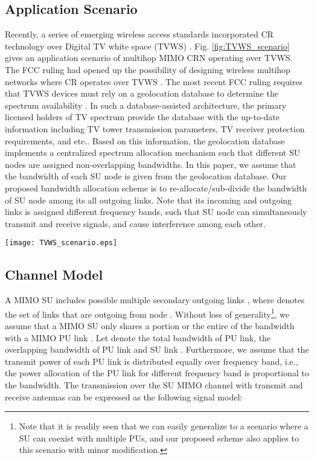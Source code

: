 \documentclass[12pt,onecolumn,tworows]{IEEEtran}
\begin{document}
\subsection{Application Scenario}
Recently, a
series of emerging wireless access standards incorporated
CR technology over Digital TV white space (TVWS)\cite{TVoverview} .
Fig. \ref{fig:TVWS_scenario} gives an application scenario of multihop MIMO CRN operating over TVWS. The FCC ruling had opened up the possibility of designing wireless multihop networks where CR operates over TVWS \cite{FCC2012Database}. The most recent FCC ruling requires that TVWS devices must rely on a geolocation database to determine the spectrum availability \cite{Chen2013Database}\cite{Murty2012Database}. In such a database-assisted architecture, the primary licensed holders of TV spectrum provide the database with the up-to-date information including TV tower transmission parameters, TV receiver protection requirements, and etc..
Based on this information, the geolocation database implements a centralized spectrum allocation mechanism such that different SU nodes are assigned non-overlapping bandwidths. In this paper, we assume that the bandwidth of each SU node is given from the geolocation database. Our proposed bandwidth allocation scheme is to re-allocate/sub-divide the bandwidth of SU node among its all outgoing links.
Note that its incoming and outgoing links is assigned different frequency bands, such that  SU node can simultaneously transmit and receive signals, and
cause interference among each other.
\begin{figure*}
\centering
\texttt{[image: TVWS\_scenario.eps]}
\caption{An application scenario of multihop MIMO CRN operating over TVWS.}
\label{fig:TVWS_scenario}
\end{figure*}

\subsection{ Channel Model}
A MIMO SU  includes possible multiple secondary outgoing links  , where  denotes the set of links that are outgoing from node .
Without loss of
generality\footnote{Note that it is readily seen that we can easily generalize to a scenario where a SU can coexist with multiple PUs, and our proposed scheme also applies to this scenario with minor modification.}, we assume that a MIMO SU  only shares a portion or the entire of the bandwidth with a MIMO PU link .
Let  denote the total bandwidth of PU link,
  the overlapping bandwidth of PU link  and SU link .
Furthermore, we assume that the transmit power of each PU link is distributed equally over frequency band, i.e., the power allocation of the PU link for different frequency band is proportional to the bandwidth. The transmission over the SU MIMO channel  with  transmit and  receive antennas can be expressed as the following signal model:
\end{document}
